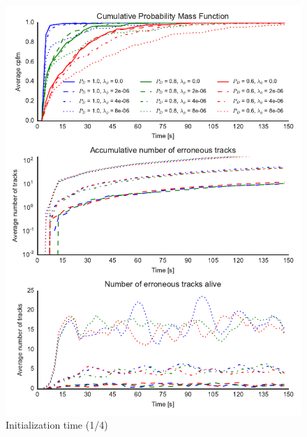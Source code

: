\begin{figure}
\centering
\includegraphics{Figures/plots/Scenario1_Init-Time(1-4).pdf}
\caption{Initialization time (1/4)}\label{fig:init_time_1-4}
\end{figure}

